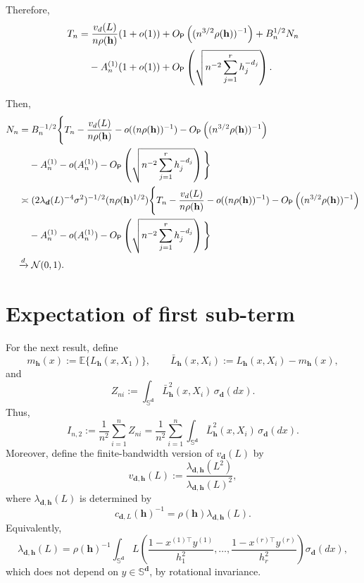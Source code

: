 \documentclass{article}
\begin{document}
Therefore,
\begin{align*}
    T_n =&\; \frac{v_d(L)}{n \rho (\bh)} (1+o(1)) + O_{\mathsf{P}}\lrp{(n^{3/2} \rho (\bh))^{-1}} + B_n^{1/2} N_n \\
    &- A_n^{(1)}(1+o(1)) + O_{\mathsf{P}} \lrp{\sqrt{n^{-2} \sum_{j=1}^{r} h_j^{-d_j} }}.
\end{align*}

Then,
\begin{align*}
    N_n =&\; B_n^{-1/2} \Bigg\{ T_n - \frac{v_d(L)}{n \rho (\bh)} - o((n \rho (\bh))^{-1}) - O_{\mathsf{P}}\lrp{(n^{3/2} \rho (\bh))^{-1}} \\
    &- A_n^{(1)} - o(A_n^{(1)}) - O_{\mathsf{P}} \lrp{\sqrt{n^{-2} \sum_{j=1}^{r} h_j^{-d_j} }} \Bigg\} \\
    \asymp&\; ( 2 \lambda_{\bd}(L)^{-4} \sigma^2)^{-1/2} (n \rho(\bh)^{1/2}) \Bigg\{ T_n - \frac{v_d(L)}{n \rho (\bh)} - o((n \rho (\bh))^{-1}) - O_{\mathsf{P}}\lrp{(n^{3/2} \rho (\bh))^{-1}} \\
    &- A_n^{(1)} - o(A_n^{(1)}) - O_{\mathsf{P}} \lrp{\sqrt{n^{-2} \sum_{j=1}^{r} h_j^{-d_j} }} \Bigg\} \\
    \xrightarrow{d}&\; \mathcal{N}(0, 1).
\end{align*}

\section{Expectation of first sub-term}

\newcommand{\Sd}{\mathbb{S}^{\mathbf d}}
\newcommand{\bh}{\mathbf h}
\newcommand{\rh}{\rho(\bh)}
\newcommand{\sigmad}{\sigma_{\mathbf d}}

For the next result, define
\[
    m_{\bh}(x) := \mathbb{E}\{L_{\bh}(x,X_1)\},
    \qquad
    \bar L_{\bh}(x,X_i) := L_{\bh}(x,X_i) - m_{\bh}(x),
\]
and
\[
    Z_{ni} := \int_{\Sd} \bar L_{\bh}^2(x,X_i)\,\sigmad(dx).
\]
Thus,
\[
    I_{n,2}
    :=
    \frac{1}{n^2}\sum_{i=1}^n Z_{ni}
    =
    \frac{1}{n^2}\sum_{i=1}^n
    \int_{\Sd} \bar L_{\bh}^2(x,X_i)\,\sigmad(dx).
\]
Moreover, define the finite-bandwidth version of \(v_{\mathbf d}(L)\) by
\[
    v_{\mathbf d,\bh}(L)
    :=
    \frac{\lambda_{\mathbf d,\bh}(L^2)}
    {\lambda_{\mathbf d,\bh}(L)^2},
\]
where \(\lambda_{\mathbf d,\bh}(L)\) is determined by
\[
    c_{\mathbf d,L}(\bh)^{-1}
    =
    \rho(\bh)\lambda_{\mathbf d,\bh}(L).
\]
Equivalently,
\[
    \lambda_{\mathbf d,\bh}(L)
    =
    \rho(\bh)^{-1}
    \int_{\Sd}
    L\left(
        \frac{1-x^{(1)\top}y^{(1)}}{h_1^2},
        \ldots,
        \frac{1-x^{(r)\top}y^{(r)}}{h_r^2}
    \right)
    \sigmad(dx),
\]
which does not depend on \(y\in\Sd\), by rotational invariance.
\end{document}
